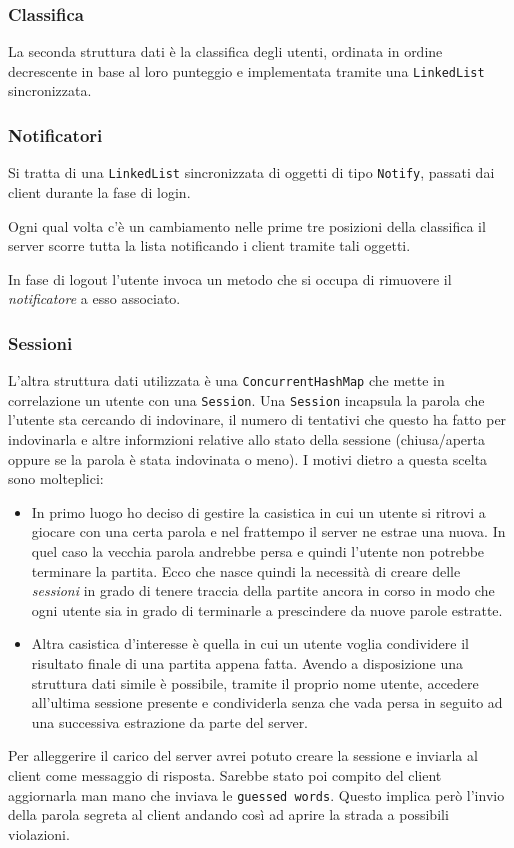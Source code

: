 \subsubsection{Classifica}
La seconda struttura dati è la classifica degli utenti, ordinata in ordine decrescente in base al
loro punteggio e implementata tramite una \verb|LinkedList| sincronizzata.

\subsubsection{Notificatori}
Si tratta di una \verb|LinkedList| sincronizzata di oggetti di tipo \verb|Notify|, passati dai
client durante la fase di login.

Ogni qual volta c'è un cambiamento nelle prime tre posizioni della classifica il server scorre
tutta la lista notificando i client tramite tali oggetti.

In fase di logout l'utente invoca un metodo che si occupa di rimuovere il \emph{notificatore}
a esso associato.

\subsubsection{Sessioni}
L'altra struttura dati utilizzata è una \verb|ConcurrentHashMap| che mette in correlazione un
utente con una \verb|Session|. Una \verb|Session| incapsula la parola che l'utente sta cercando di
indovinare, il numero di tentativi che questo ha fatto per indovinarla e altre informzioni relative
allo stato della sessione (chiusa/aperta oppure se la parola è stata indovinata o meno). I motivi
dietro a questa scelta sono molteplici:
\begin{itemize}
	\item In primo luogo ho deciso di gestire la casistica in cui un utente si ritrovi a giocare
	      con una certa parola e nel frattempo il server ne estrae una nuova. In quel caso la
	      vecchia parola andrebbe persa e quindi l'utente non potrebbe terminare la partita. Ecco
	      che nasce quindi la necessità di creare delle \emph{sessioni} in grado di tenere
	      traccia della partite ancora in corso in modo che ogni utente sia in grado di
	      terminarle a prescindere da nuove parole estratte.
	\item Altra casistica d'interesse è quella in cui un utente voglia condividere il risultato
	      finale di una partita appena fatta. Avendo a disposizione una struttura dati simile è
	      possibile, tramite il proprio nome utente, accedere all'ultima sessione presente e
	      condividerla senza che vada persa in seguito ad una successiva estrazione da parte del
	      server.
\end{itemize}
Per alleggerire il carico del server avrei potuto creare la sessione e inviarla al client come
messaggio di risposta. Sarebbe stato poi compito del client aggiornarla man mano che inviava le
\verb|guessed words|. Questo implica però l'invio della parola segreta al client andando così ad
aprire la strada a possibili violazioni.

